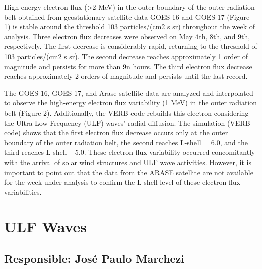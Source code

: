 \documentclass[a4paper, 10pt]{article}
\begin{document}
                     High-energy electron flux (>2 MeV) in the outer boundary of the outer radiation belt obtained from geostationary satellite data GOES-16 and GOES-17 (Figure 1) is stable around the threshold 103 particles/(cm2 s sr) throughout the week of analysis. Three electron flux decreases were observed on May 4th, 8th, and 9th, respectively. The first decrease is considerably rapid, returning to the threshold of 103 particles/(cm2 s sr). The second decrease reaches approximately 1 order of magnitude and persists for more than 9n hours. The third electron flux decrease reaches approximately 2 orders of magnitude and persists until the last record.    

The GOES-16, GOES-17, and Arase satellite data are analyzed and interpolated to observe the high-energy electron flux variability (1 MeV) in the outer radiation belt (Figure 2). Additionally, the VERB code rebuilds this electron considering the Ultra Low Frequency (ULF) waves' radial diffusion. The simulation (VERB code) shows that the first electron flux decrease occurs only at the outer boundary of the outer radiation belt, the second reaches L-shell = 6.0, and the third reaches L-shell – 5.0. These electron flux variability occurred concomitantly with the arrival of solar wind structures and ULF wave activities. However, it is important to point out that the data from the ARASE satellite are not available for the week under analysis to confirm the L-shell level of these electron flux variabilities.\section{ULF Waves} 
 \subsection{Responsible: José Paulo Marchezi} 
 
\end{document}
